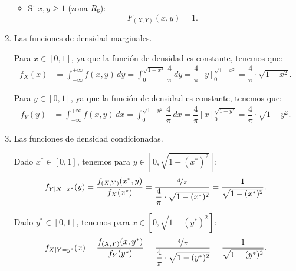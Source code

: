 \begin{ejercicio}
\begin{enumerate}
\begin{itemize}
            \item \ul{Si $x,y\geq 1$} (zona $R_6$):
            \begin{equation*}
                F_{(X,Y)}(x, y) = 1.
            \end{equation*}
        \end{itemize}


        \item Las funciones de densidad marginales.
        
        Para $x\in [0,1]$, ya que la función de densidad es constante, tenemos que:
        \begin{align*}
            f_X(x) &= \int_{-\infty}^{+\infty} f(x, y) \, dy = \int_{0}^{\sqrt{1-x^2}} \dfrac{4}{\pi} \, dy = \dfrac{4}{\pi}\left[y\right]_{0}^{\sqrt{1-x^2}} = \dfrac{4}{\pi}\cdot \sqrt{1-x^2}.
        \end{align*}

        Para $y\in [0,1]$, ya que la función de densidad es constante, tenemos que:
        \begin{align*}
            f_Y(y) &= \int_{-\infty}^{+\infty} f(x, y) \, dx = \int_{0}^{\sqrt{1-y^2}} \dfrac{4}{\pi} \, dx = \dfrac{4}{\pi}\left[x\right]_{0}^{\sqrt{1-y^2}} = \dfrac{4}{\pi}\cdot \sqrt{1-y^2}.
        \end{align*}
        \item Las funciones de densidad condicionadas.
        
        Dado $x^\ast\in [0,1]$, tenemos para $y\in [0,\sqrt{1-(x^{\ast})^2}]$:
        \begin{equation*}
            f_{Y\mid X=x^\ast} (y) = \dfrac{f_{(X,Y)}(x^\ast, y)}{f_X(x^\ast)} = \dfrac{\nicefrac{4}{\pi}}{\dfrac{4}{\pi}\cdot \sqrt{1-(x^{\ast})^2}} = \dfrac{1}{\sqrt{1-(x^{\ast})^2}}.
        \end{equation*}

        Dado $y^\ast\in [0,1]$, tenemos para $x\in [0,\sqrt{1-(y^{\ast})^2}]$:
        \begin{equation*}
            f_{X\mid Y=y^\ast} (x) = \dfrac{f_{(X,Y)}(x, y^\ast)}{f_Y(y^\ast)} = \dfrac{\nicefrac{4}{\pi}}{\dfrac{4}{\pi}\cdot \sqrt{1-(y^{\ast})^2}} = \dfrac{1}{\sqrt{1-(y^{\ast})^2}}.
        \end{equation*}
    \end{enumerate}
\end{ejercicio}

